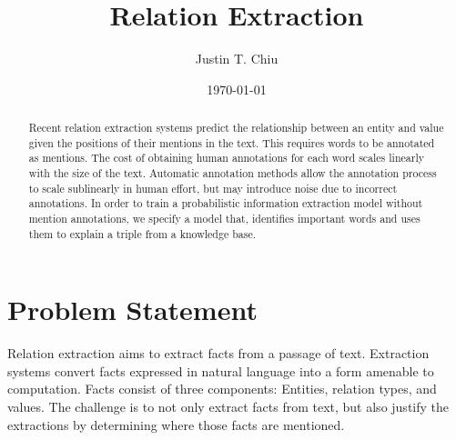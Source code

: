 \documentclass[12pt]{article}
\title{Relation Extraction}
\author{
Justin T. Chiu
}
\date{\today}
\begin{document}
\maketitle

\begin{abstract}
Recent relation extraction systems predict the relationship between
an entity and value given the positions of their mentions in the text.
This requires words to be annotated as mentions.
The cost of obtaining human annotations for each word scales
linearly with the size of the text.
Automatic annotation methods allow the annotation process to scale sublinearly
in human effort, but may introduce noise due to incorrect annotations.
In order to train a probabilistic information extraction model without mention
annotations, we specify a model that, identifies important words 
and uses them to explain a triple from a knowledge base.
\end{abstract}

\section{Problem Statement}
\begin{comment}
NOTE on RE vs KBP: KBP focuses on modeling the full database, whereas
in RE the emphasis is on explaining extractions.
KBP usually has a more complicated model over the KB,
while RE sometimes makes simplifying assumptions and could make a poor
KBP system.
Example: if triple double appears in text and someone scored < 10 PTS,
then it's more likely they more likely had > 10 REB.
The difference between RE and KBP is subtle. Both fall under
information extraction, and the models may overlap in many ways.
In fact, latent variable model approaches to RE are usually able to perform KBP as well.
However, the focus is usually not on having good aggregate extraction metrics,
but rather about identifying where facts are in text.
This leads to simplifying assumptions in the model of the KB itself.
On the other hand, KBP moves the difficulty from explaining extractions to
faithfully modeling the KB.
Typically this results in a challenging inference task, as the structure
of the KB may be very complex.
\end{comment}

Relation extraction aims to extract facts from a passage of text.
Extraction systems convert facts expressed in natural language into a form
amenable to computation.
Facts consist of three components: Entities, relation types, and values.
The challenge is to not only extract facts from text, but also
justify the extractions by determining where those facts are mentioned.
\end{document}
